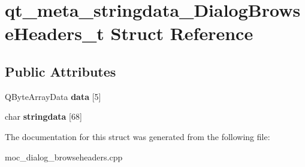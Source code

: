 \hypertarget{structqt__meta__stringdata__DialogBrowseHeaders__t}{\section{qt\-\_\-meta\-\_\-stringdata\-\_\-\-Dialog\-Browse\-Headers\-\_\-t Struct Reference}
\label{structqt__meta__stringdata__DialogBrowseHeaders__t}
}
\subsection*{Public Attributes}
\begin{DoxyCompactItemize}
\item 
\hypertarget{structqt__meta__stringdata__DialogBrowseHeaders__t_a06dc2b484cb7b7f33783b654a2c80c85}{Q\-Byte\-Array\-Data {\bfseries data} \mbox{[}5\mbox{]}}\label{structqt__meta__stringdata__DialogBrowseHeaders__t_a06dc2b484cb7b7f33783b654a2c80c85}

\item 
\hypertarget{structqt__meta__stringdata__DialogBrowseHeaders__t_aa4042590207bfb338c6fbe4038457ad9}{char {\bfseries stringdata} \mbox{[}68\mbox{]}}\label{structqt__meta__stringdata__DialogBrowseHeaders__t_aa4042590207bfb338c6fbe4038457ad9}

\end{DoxyCompactItemize}


The documentation for this struct was generated from the following file\-:\begin{DoxyCompactItemize}
\item 
moc\-\_\-dialog\-\_\-browseheaders.\-cpp\end{DoxyCompactItemize}
